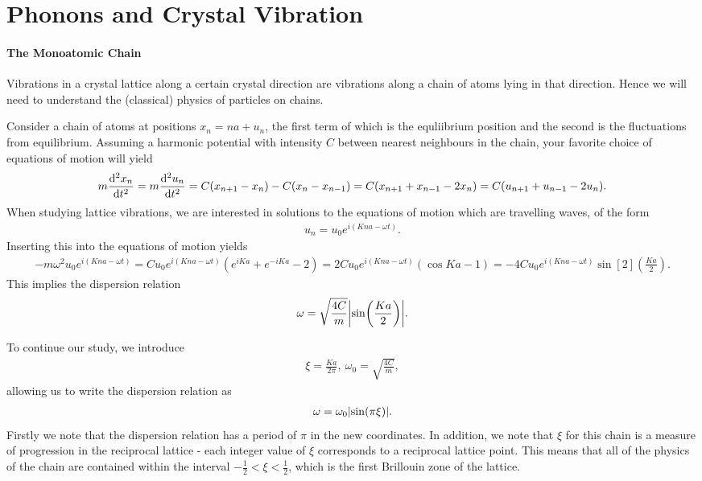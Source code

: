 \section{Phonons and Crystal Vibration}

\paragraph{The Monoatomic Chain}
Vibrations in a crystal lattice along a certain crystal direction are vibrations along a chain of atoms lying in that direction. Hence we will need to understand the (classical) physics of particles on chains.

Consider a chain of atoms at positions $x_{n} = na + u_{n}$, the first term of which is the equliibrium position and the second is the fluctuations from equilibrium. Assuming a harmonic potential with intensity $C$ between nearest neighbours in the chain, your favorite choice of equations of motion will yield
\begin{align*}
	m\dv[2]{x_{n}}{t} = m\dv[2]{u_{n}}{t} = C(x_{n + 1} - x_{n}) - C(x_{n} - x_{n - 1}) = C(x_{n + 1} + x_{n - 1} - 2x_{n}) = C(u_{n + 1} + u_{n - 1} - 2u_{n}).
\end{align*}
When studying lattice vibrations, we are interested in solutions to the equations of motion which are travelling waves, of the form
\begin{align*}
	u_{n} = u_{0}e^{i(Kna - \omega t)}.
\end{align*}
Inserting this into the equations of motion yields
\begin{align*}
	-m\omega^{2}u_{0}e^{i(Kna - \omega t)} = Cu_{0}e^{i(Kna - \omega t)}\left(e^{iKa} + e^{-iKa} - 2\right) = 2Cu_{0}e^{i(Kna - \omega t)}\left(\cos{Ka} - 1\right) = -4Cu_{0}e^{i(Kna - \omega t)}\sin[2](\frac{Ka}{2}).
\end{align*}
This implies the dispersion relation
\begin{align*}
	\omega = \sqrt{\frac{4C}{m}}\abs{\sin(\frac{Ka}{2})}.
\end{align*}

To continue our study, we introduce
\begin{align*}
	\xi = \frac{Ka}{2\pi},\ \omega_{0} = \sqrt{\frac{4C}{m}},
\end{align*}
allowing us to write the dispersion relation as
\begin{align*}
	\omega = \omega_{0}\abs{\sin(\pi\xi)}.
\end{align*}
Firstly we note that the dispersion relation has a period of $\pi$ in the new coordinates. In addition, we note that $\xi$ for this chain is a measure of progression in the reciprocal lattice - each integer value of $\xi$ corresponds to a reciprocal lattice point. This means that all of the physics of the chain are contained within the interval $-\frac{1}{2} < \xi < \frac{1}{2}$, which is the first Brillouin zone of the lattice.


